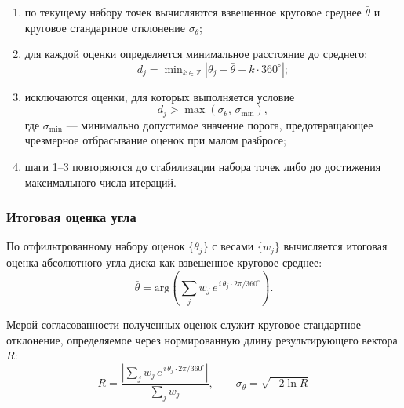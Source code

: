 \begin{enumerate}
    \item по текущему набору точек вычисляются взвешенное круговое среднее $\bar\theta$ и круговое стандартное отклонение $\sigma_\theta$;
    \item для каждой оценки определяется минимальное расстояние до среднего:
    \begin{equation}
        d_j = \min\nolimits_{k\in\mathbb{Z}} |\theta_j - \bar\theta + k\cdot 360^\circ|;
    \end{equation}
    \item исключаются оценки, для которых выполняется условие
    \begin{equation}
        d_j > \max(\sigma_\theta,\,\sigma_{\min}),
    \end{equation}
    где $\sigma_{\min}$ --- минимально допустимое значение порога, предотвращающее чрезмерное отбрасывание оценок при малом разбросе;
    \item шаги 1--3 повторяются до стабилизации набора точек либо до достижения максимального числа итераций.
\end{enumerate}

\subsubsection{Итоговая оценка угла}

По отфильтрованному набору оценок $\{\theta_j\}$ с весами $\{w_j\}$ вычисляется итоговая оценка абсолютного угла диска как взвешенное круговое среднее:
\begin{equation}
    \bar\theta = \mathrm{arg}\!\left(\sum_j w_j \, e^{\,i\,\theta_j\cdot 2\pi/360^\circ}\right).
    \label{eq:circ_mean}
\end{equation}

Мерой согласованности полученных оценок служит круговое стандартное отклонение, определяемое через нормированную длину результирующего вектора $R$:
\begin{equation}
    R = \frac{\left|\sum_j w_j \, e^{\,i\,\theta_j\cdot 2\pi/360^\circ}\right|}{\sum_j w_j}, \qquad \sigma_\theta = \sqrt{-2\ln R}
    \label{eq:circ_std}
\end{equation}